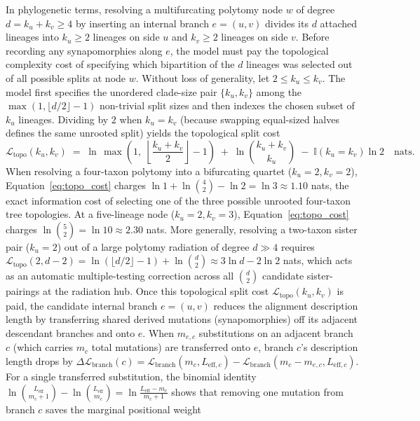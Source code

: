 \documentclass[11pt,a4paper]{article}
\begin{document}
In phylogenetic terms, resolving a multifurcating polytomy node $w$ of degree $d = k_u + k_v \ge 4$ by inserting an internal branch $e = (u,v)$ divides its $d$ attached lineages into $k_u \ge 2$ lineages on side $u$ and $k_v \ge 2$ lineages on side $v$. Before recording any synapomorphies along $e$, the model must pay the topological complexity cost of specifying which bipartition of the $d$ lineages was selected out of all possible splits at node $w$. Without loss of generality, let $2 \le k_u \le k_v$. The model first specifies the unordered clade-size pair $\{k_u, k_v\}$ among the $\max(1, \lfloor d/2\rfloor - 1)$ non-trivial split sizes and then indexes the chosen subset of $k_u$ lineages. Dividing by $2$ when $k_u = k_v$ (because swapping equal-sized halves defines the same unrooted split) yields the topological split cost
\begin{equation}
    \mathcal{L}_{\text{topo}}(k_u, k_v) \;=\; \ln\,\max\!\left(1,\; \left\lfloor\frac{k_u + k_v}{2}\right\rfloor - 1\right) \;+\; \ln\binom{k_u + k_v}{k_u} \;-\; \mathbb{I}(k_u = k_v)\ln 2 \quad \text{nats}.
    \label{eq:topo_cost}
\end{equation}
When resolving a four-taxon polytomy into a bifurcating quartet ($k_u = 2, k_v = 2$), Equation~\eqref{eq:topo_cost} charges $\ln 1 + \ln\binom{4}{2} - \ln 2 = \ln 3 \approx 1.10$ nats, the exact information cost of selecting one of the three possible unrooted four-taxon tree topologies. At a five-lineage node ($k_u = 2, k_v = 3$), Equation~\eqref{eq:topo_cost} charges $\ln\binom{5}{2} = \ln 10 \approx 2.30$ nats. More generally, resolving a two-taxon sister pair ($k_u = 2$) out of a large polytomy radiation of degree $d \gg 4$ requires $\mathcal{L}_{\text{topo}}(2, d-2) = \ln(\lfloor d/2\rfloor - 1) + \ln\binom{d}{2} \approx 3\ln d - 2\ln 2$ nats, which acts as an automatic multiple-testing correction across all $\binom{d}{2}$ candidate sister-pairings at the radiation hub. Once this topological split cost $\mathcal{L}_{\text{topo}}(k_u, k_v)$ is paid, the candidate internal branch $e = (u,v)$ reduces the alignment description length by transferring shared derived mutations (synapomorphies) off its adjacent descendant branches and onto $e$. When $m_{e,c}$ substitutions on an adjacent branch $c$ (which carries $m_c$ total mutations) are transferred onto $e$, branch $c$'s description length drops by $\Delta\mathcal{L}_{\text{branch}}(c) = \mathcal{L}_{\text{branch}}(m_c, L_{\text{eff},c}) - \mathcal{L}_{\text{branch}}(m_c - m_{e,c}, L_{\text{eff},c})$. For a single transferred substitution, the binomial identity $\ln\binom{L_{\text{eff}}}{m_c + 1} - \ln\binom{L_{\text{eff}}}{m_c} = \ln\frac{L_{\text{eff}} - m_c}{m_c + 1}$ shows that removing one mutation from branch $c$ saves the marginal positional weight
\end{document}
